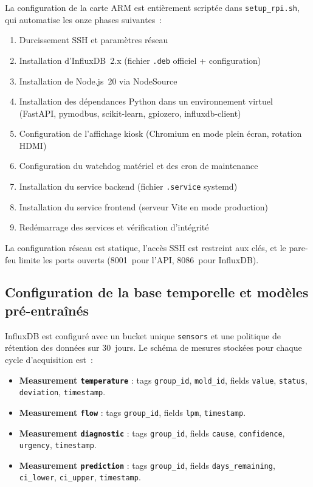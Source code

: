 La configuration de la carte ARM est entièrement scriptée dans \texttt{setup\_rpi.sh}, qui automatise les onze phases suivantes~:

\begin{enumerate}
  \item Durcissement SSH et paramètres réseau
  \item Installation d'InfluxDB~2.x (fichier \texttt{.deb} officiel + configuration)
  \item Installation de Node.js~20 via NodeSource
  \item Installation des dépendances Python dans un environnement virtuel (FastAPI, pymodbus, scikit-learn, gpiozero, influxdb-client)
  \item Configuration de l'affichage kiosk (Chromium en mode plein écran, rotation HDMI)
  \item Configuration du watchdog matériel et des cron de maintenance
  \item Installation du service backend (fichier \texttt{.service} systemd)
  \item Installation du service frontend (serveur Vite en mode production)
  \item Redémarrage des services et vérification d'intégrité
\end{enumerate}

La configuration réseau est statique, l'accès SSH est restreint aux clés, et le pare-feu limite les ports ouverts (8001~pour l'API, 8086~pour InfluxDB).

\subsection{Configuration de la base temporelle et modèles pré-entraînés}

InfluxDB est configuré avec un bucket unique \texttt{sensors} et une politique de rétention des données sur 30~jours. Le schéma de mesures stockées pour chaque cycle d'acquisition est~:

\begin{itemize}
  \item \textbf{Measurement \texttt{temperature}} : tags \texttt{group\_id}, \texttt{mold\_id}, fields \texttt{value}, \texttt{status}, \texttt{deviation}, \texttt{timestamp}.
  \item \textbf{Measurement \texttt{flow}} : tags \texttt{group\_id}, fields \texttt{lpm}, \texttt{timestamp}.
  \item \textbf{Measurement \texttt{diagnostic}} : tags \texttt{group\_id}, fields \texttt{cause}, \texttt{confidence}, \texttt{urgency}, \texttt{timestamp}.
  \item \textbf{Measurement \texttt{prediction}} : tags \texttt{group\_id}, fields \texttt{days\_remaining}, \texttt{ci\_lower}, \texttt{ci\_upper}, \texttt{timestamp}.
\end{itemize}

